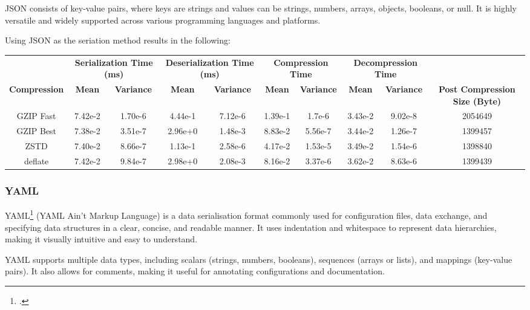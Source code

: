 JSON consists of key-value pairs, where keys are strings and values can be strings, numbers, arrays, objects, booleans, or null. It is highly versatile and widely supported across various programming languages and platforms.

Using JSON as the seriation method results in the following:

\begin{table}[H]
\centering
\begin{tabular}{cccccccccc}
\hline
 &
  \multicolumn{2}{c}{\textbf{Serialization Time (ms)}} &
  \multicolumn{2}{c}{\textbf{Deserialization Time (ms)}} &
  \multicolumn{2}{c}{\textbf{Compression Time}} &
  \multicolumn{2}{c}{\textbf{Decompression Time}} &
   \\
\textbf{Compression} & \textbf{Mean}     & \textbf{Variance} & \textbf{Mean}     & \textbf{Variance} & \textbf{Mean}     & \textbf{Variance} & \textbf{Mean}     & \textbf{Variance} & \textbf{Post Compression Size (Byte)} \\
\hline
GZIP Fast           & 7.42e-2 & 1.70e-6 & 4.44e-1 & 7.12e-6 & 1.39e-1 & 1.7e-6   & 3.43e-2  & 9.02e-8 & 2054649                               \\
GZIP Best           & 7.38e-2 & 3.51e-7 & 2.96e+0 & 1.48e-3 & 8.83e-2 & 5.56e-7 & 3.44e-2 & 1.26e-7 & 1399457                               \\
ZSTD                & 7.40e-2 & 8.66e-7 & 1.13e-1 & 2.58e-6  & 4.17e-2 & 1.53e-5 & 3.49e-2 & 1.54e-6 & 1398840                               \\
deflate             & 7.42e-2 & 9.84e-7  & 2.98e+0 & 2.08e-3 & 8.16e-2 & 3.37e-6 & 3.62e-2 & 8.63e-6 & 1399439   \\
\hline
\end{tabular}
\end{table}

\subsubsection{YAML}
YAML\footcite{yaml} (YAML Ain't Markup Language) is a data serialisation format commonly used for configuration files, data exchange, and specifying data structures in a clear, concise, and readable manner. It uses indentation and whitespace to represent data hierarchies, making it visually intuitive and easy to understand.

YAML supports multiple data types, including scalars (strings, numbers, booleans), sequences (arrays or lists), and mappings (key-value pairs). It also allows for comments, making it useful for annotating configurations and documentation.

